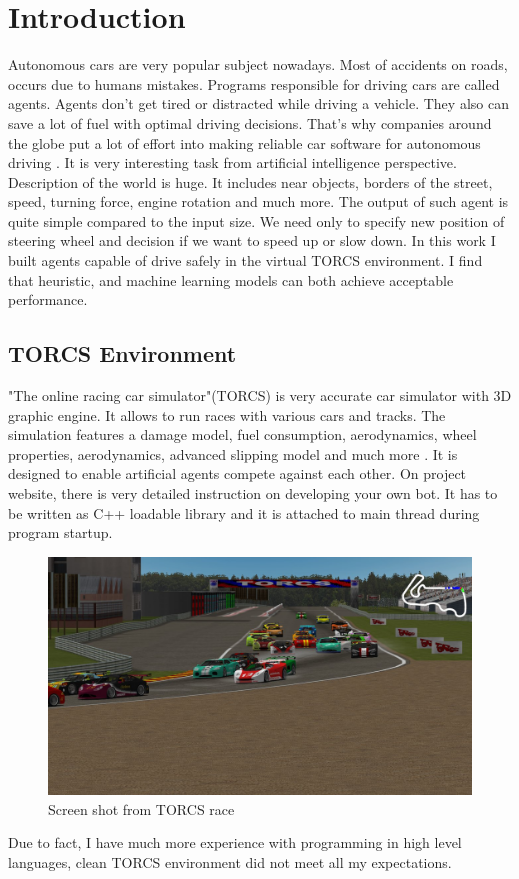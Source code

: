 \documentclass[declaration,shortabstract,english,inz]{iithesis}
\author         {Kacper Kulczak}
\begin{document}


\chapter{Introduction}

Autonomous cars are very popular subject nowadays.
Most of accidents on roads, occurs due to humans mistakes.
Programs responsible for driving cars are called agents.
Agents don't get tired or distracted while driving a vehicle.
They also can save a lot of fuel with optimal driving decisions.
That's why companies around the globe put a lot of effort into making reliable car software for autonomous driving \cite{autonomus_driving}.
It is very interesting task from artificial intelligence perspective. Description of the world is huge.
It includes near objects, borders of the street, speed, turning force, engine rotation and much more.
The output of such agent is quite simple compared to the input size.
We need only to specify new position of steering wheel and decision if we want to speed up or slow down.
In this work  I built agents  capable of drive safely in the virtual TORCS environment. I find that heuristic, and machine learning models can both achieve acceptable performance.



\section{TORCS Environment}
"The online racing car simulator"(TORCS) is very accurate car simulator with 3D graphic engine.
It allows to run races with various cars and tracks.
The simulation features a damage model, fuel consumption, aerodynamics, wheel properties, aerodynamics, advanced slipping model and much more \cite{TORCS}.
It is designed to enable artificial agents compete against each other.
On project website, there is very detailed instruction on developing your own bot.
It has to be written as C++ loadable library and it is attached to main thread during program startup.


\begin{figure}[h]
    \includegraphics[width=\linewidth]{img/torcs_look.jpeg}
    \caption{Screen shot from TORCS race \cite{TORCS}}
    \label{fig:torcs}
\end{figure}
Due to fact, I have much more experience with programming in high level languages, clean TORCS environment did not meet all my expectations. 
\end{document}
